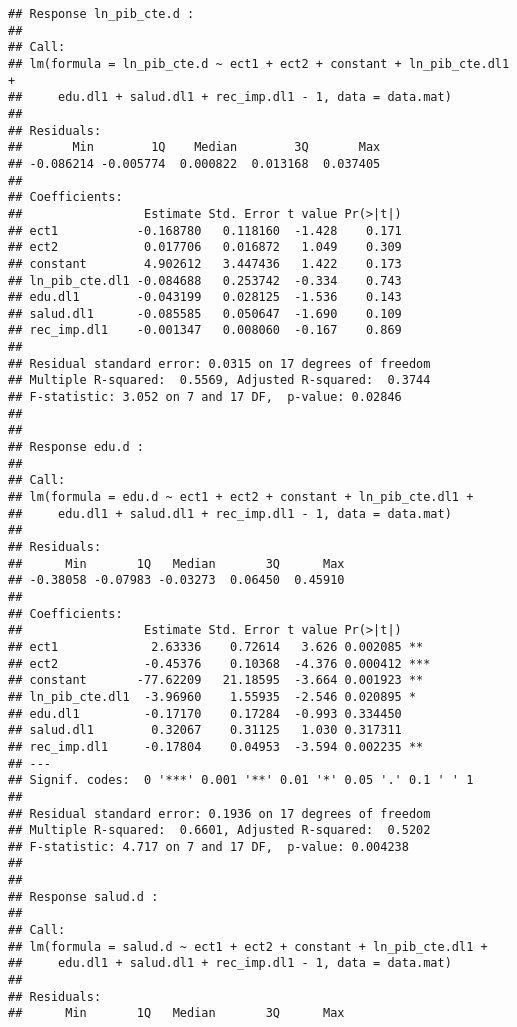\documentclass[]{book}
\newenvironment{Shaded}{\begin{snugshade}}{\end{snugshade}}
\newcommand{\KeywordTok}[1]{\textcolor[rgb]{0.13,0.29,0.53}{\textbf{#1}}}
\newcommand{\OperatorTok}[1]{\textcolor[rgb]{0.81,0.36,0.00}{\textbf{#1}}}
\newcommand{\NormalTok}[1]{#1}
\theoremstyle{definition}
\theoremstyle{definition}
\theoremstyle{definition}
\theoremstyle{remark}
\begin{document}
\begin{Shaded}
\end{Shaded}

\begin{verbatim}
## Response ln_pib_cte.d :
## 
## Call:
## lm(formula = ln_pib_cte.d ~ ect1 + ect2 + constant + ln_pib_cte.dl1 + 
##     edu.dl1 + salud.dl1 + rec_imp.dl1 - 1, data = data.mat)
## 
## Residuals:
##       Min        1Q    Median        3Q       Max 
## -0.086214 -0.005774  0.000822  0.013168  0.037405 
## 
## Coefficients:
##                 Estimate Std. Error t value Pr(>|t|)
## ect1           -0.168780   0.118160  -1.428    0.171
## ect2            0.017706   0.016872   1.049    0.309
## constant        4.902612   3.447436   1.422    0.173
## ln_pib_cte.dl1 -0.084688   0.253742  -0.334    0.743
## edu.dl1        -0.043199   0.028125  -1.536    0.143
## salud.dl1      -0.085585   0.050647  -1.690    0.109
## rec_imp.dl1    -0.001347   0.008060  -0.167    0.869
## 
## Residual standard error: 0.0315 on 17 degrees of freedom
## Multiple R-squared:  0.5569, Adjusted R-squared:  0.3744 
## F-statistic: 3.052 on 7 and 17 DF,  p-value: 0.02846
## 
## 
## Response edu.d :
## 
## Call:
## lm(formula = edu.d ~ ect1 + ect2 + constant + ln_pib_cte.dl1 + 
##     edu.dl1 + salud.dl1 + rec_imp.dl1 - 1, data = data.mat)
## 
## Residuals:
##      Min       1Q   Median       3Q      Max 
## -0.38058 -0.07983 -0.03273  0.06450  0.45910 
## 
## Coefficients:
##                 Estimate Std. Error t value Pr(>|t|)    
## ect1             2.63336    0.72614   3.626 0.002085 ** 
## ect2            -0.45376    0.10368  -4.376 0.000412 ***
## constant       -77.62209   21.18595  -3.664 0.001923 ** 
## ln_pib_cte.dl1  -3.96960    1.55935  -2.546 0.020895 *  
## edu.dl1         -0.17170    0.17284  -0.993 0.334450    
## salud.dl1        0.32067    0.31125   1.030 0.317311    
## rec_imp.dl1     -0.17804    0.04953  -3.594 0.002235 ** 
## ---
## Signif. codes:  0 '***' 0.001 '**' 0.01 '*' 0.05 '.' 0.1 ' ' 1
## 
## Residual standard error: 0.1936 on 17 degrees of freedom
## Multiple R-squared:  0.6601, Adjusted R-squared:  0.5202 
## F-statistic: 4.717 on 7 and 17 DF,  p-value: 0.004238
## 
## 
## Response salud.d :
## 
## Call:
## lm(formula = salud.d ~ ect1 + ect2 + constant + ln_pib_cte.dl1 + 
##     edu.dl1 + salud.dl1 + rec_imp.dl1 - 1, data = data.mat)
## 
## Residuals:
##      Min       1Q   Median       3Q      Max 

\end{verbatim}
\end{document}
